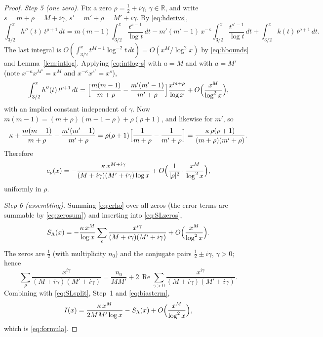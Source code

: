 \documentclass[11pt]{amsart}
\theoremstyle{definition}
\numberwithin{equation}{section}
\newcommand{\re}{\operatorname{Re}}
\begin{document}
\begin{proof}
\emph{Step 5 (one zero).} Fix a zero $\rho=\tfrac12+i\gamma$,
$\gamma\in\mathbb R$, and write $s=m+\rho=M+i\gamma$,
$s'=m'+\rho=M'+i\gamma$. By \eqref{eq:hderivs},
\[
\int_{3/2}^xh''(t)\,t^{\rho+1}\,dt
=m(m-1)\int_{3/2}^x\frac{t^{s-1}}{\log t}\,dt
-m'(m'-1)\,x^{-\kappa}\int_{3/2}^x\frac{t^{s'-1}}{\log t}\,dt
+\int_{3/2}^xk(t)\,t^{\rho+1}\,dt .
\]
The last integral is $O(\int_{3/2}^xt^{M-1}\log^{-2}t\,dt)
=O(x^M/\log^2x)$ by \eqref{eq:hbounds} and Lemma~\ref{lem:intlog}.
Applying \eqref{eq:intlog-s} with $a=M$ and with $a=M'$ (note
$x^{-\kappa}x^{M'}=x^M$ and $x^{-\kappa}x^{s'}=x^{s}$),
\[
\int_{3/2}^xh''(t)\,t^{\rho+1}\,dt
=\Bigl[\frac{m(m-1)}{m+\rho}-\frac{m'(m'-1)}{m'+\rho}\Bigr]
\frac{x^{m+\rho}}{\log x}+O\Bigl(\frac{x^M}{\log^2x}\Bigr),
\]
with an implied constant independent of $\gamma$. Now
$m(m-1)=(m+\rho)(m-1-\rho)+\rho(\rho+1)$, and likewise for $m'$, so
\begin{equation}\label{eq:bracket}
\kappa+\frac{m(m-1)}{m+\rho}-\frac{m'(m'-1)}{m'+\rho}
=\rho(\rho+1)\Bigl[\frac1{m+\rho}-\frac1{m'+\rho}\Bigr]
=\frac{\kappa\,\rho(\rho+1)}{(m+\rho)(m'+\rho)} .
\end{equation}
Therefore
\begin{equation}\label{eq:crho}
c_\rho(x)=-\frac{\kappa\,x^{M+i\gamma}}{(M+i\gamma)(M'+i\gamma)\log x}
+O\Bigl(\frac{1}{|\rho|^2}\cdot\frac{x^M}{\log^2x}\Bigr),
\end{equation}
uniformly in $\rho$.

\emph{Step 6 (assembling).} Summing \eqref{eq:crho} over all zeros
(the error terms are summable by \eqref{eq:zerosum}) and inserting
into \eqref{eq:SLzeros},
\[
S_\Lambda(x)=-\frac{\kappa\,x^M}{\log x}
\sum_\rho\frac{x^{i\gamma}}{(M+i\gamma)(M'+i\gamma)}
+O\Bigl(\frac{x^M}{\log^2x}\Bigr).
\]
The zeros are $\tfrac12$ (with multiplicity $n_0$) and the conjugate
pairs $\tfrac12\pm i\gamma$, $\gamma>0$; hence
\[
\sum_\rho\frac{x^{i\gamma}}{(M+i\gamma)(M'+i\gamma)}
=\frac{n_0}{MM'}+2\,\re\sum_{\gamma>0}\frac{x^{i\gamma}}{(M+i\gamma)(M'+i\gamma)}.
\]
Combining with \eqref{eq:SLsplit}, Step~1 and \eqref{eq:biasterm},
\[
I(x)=\frac{\kappa\,x^M}{2MM'\log x}-S_\Lambda(x)
+O\Bigl(\frac{x^M}{\log^2x}\Bigr),
\]
which is \eqref{eq:formula}.
\end{proof}
\end{document}
